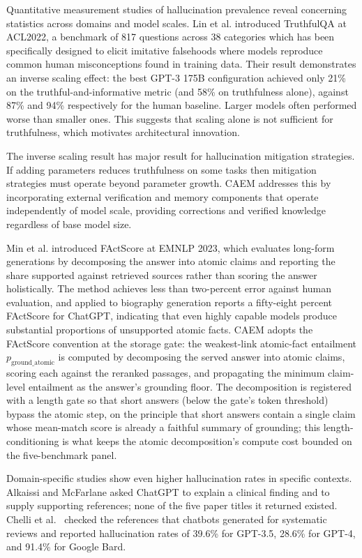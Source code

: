 Quantitative measurement studies of hallucination prevalence reveal concerning statistics across domains and model scales. Lin et al. \cite{lin-etal-2022-truthfulqa} introduced TruthfulQA at ACL2022, a benchmark of 817 questions across 38 categories which has been specifically designed to elicit imitative falsehoods where models reproduce common human misconceptions found in training data. Their result demonstrates an inverse scaling effect: the best GPT-3 175B configuration achieved only 21\% on the truthful-and-informative metric (and 58\% on truthfulness alone), against 87\% and 94\% respectively for the human baseline. Larger models often performed worse than smaller ones. This suggests that scaling alone is not sufficient for truthfulness, which motivates architectural innovation.

The inverse scaling result has major result for hallucination mitigation strategies. If adding parameters reduces truthfulness on some tasks then mitigation strategies must operate beyond parameter growth. CAEM addresses this by incorporating external verification and memory components that operate independently of model scale, providing corrections and verified knowledge regardless of base model size.

Min et al. \cite{min-etal-2023-factscore} introduced FActScore at EMNLP 2023, which evaluates long-form generations by decomposing the answer into atomic claims and reporting the share supported against retrieved sources rather than scoring the answer holistically. The method achieves less than two-percent error against human evaluation, and applied to biography generation reports a fifty-eight percent FActScore for ChatGPT, indicating that even highly capable models produce substantial proportions of unsupported atomic facts. CAEM adopts the FActScore convention at the storage gate: the weakest-link atomic-fact entailment $p_{\text{ground\_atomic}}$ is computed by decomposing the served answer into atomic claims, scoring each against the reranked passages, and propagating the minimum claim-level entailment as the answer's grounding floor. The decomposition is registered with a length gate so that short answers (below the gate's token threshold) bypass the atomic step, on the principle that short answers contain a single claim whose mean-match score is already a faithful summary of grounding; this length-conditioning is what keeps the atomic decomposition's compute cost bounded on the five-benchmark panel.

Domain-specific studies show even higher hallucination rates in specific contexts. Alkaissi and McFarlane \cite{alkaissi2023artificial} asked ChatGPT to explain a clinical finding and to supply supporting references; none of the five paper titles it returned existed. Chelli et al.\ \cite{info:doi/10.2196/53164} checked the references that chatbots generated for systematic reviews and reported hallucination rates of 39.6\% for GPT-3.5, 28.6\% for GPT-4, and 91.4\% for Google Bard.

